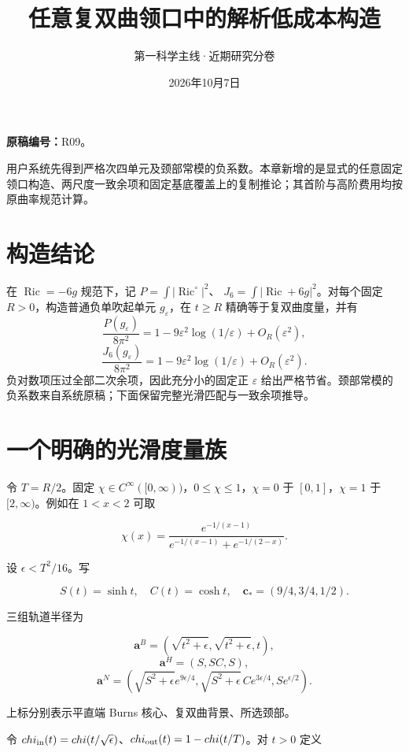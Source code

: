 \documentclass[UTF8,11pt,fontset=none]{ctexart}
\title{任意复双曲领口中的解析低成本构造}
\author{第一科学主线·近期研究分卷}
\date{2026年10月7日}
\begin{document}
\maketitle
\noindent\textbf{原稿编号：}R09。

用户系统先得到严格次四单元及颈部常模的负系数。本章新增的是显式的任意固定领口构造、两尺度一致余项和固定基底覆盖上的复制推论；其首阶与高阶费用均按原曲率规范计算。\cite{R09,System,CellSource}

\section{构造结论}\label{ch9:ux6784ux9020ux7ed3ux8bba}

在 \(\operatorname{Ric}=-6g\) 规范下，记 \(P=\int|\operatorname{Ric}^{\circ}|^2\)、 \(J_6=\int|\operatorname{Ric}+6g|^2\)。对每个固定 \(R>0\)，构造普通负单吹起单元 \(g_\varepsilon\)，在 \(t\ge R\) 精确等于复双曲度量，并有 \[
\frac{P(g_\varepsilon)}{8\pi^2}
=1-9\varepsilon^2\log(1/\varepsilon)+O_R(\varepsilon^2),
\] \[
\frac{J_6(g_\varepsilon)}{8\pi^2}
=1-9\varepsilon^2\log(1/\varepsilon)+O_R(\varepsilon^2).
\tag{9.1}\label{eq:r9:1}
\] 负对数项压过全部二次余项，因此充分小的固定正 \(\varepsilon\) 给出严格节省。颈部常模的负系数来自系统原稿；下面保留完整光滑匹配与一致余项推导。

\section{一个明确的光滑度量族}\label{ch9:ux4e00ux4e2aux660eux786eux7684ux5149ux6ed1ux5ea6ux91cfux65cf}

令 \(T=R/2\)。固定 \(\chi\in C^\infty([0,\infty))\)，\(0\le\chi\le1\)，\(\chi=0\) 于 \([0,1]\)，\(\chi=1\) 于 \([2,\infty)\)。例如在 \(1<x<2\) 可取

\[
\chi(x)=\frac{e^{-1/(x-1)}}{e^{-1/(x-1)}+e^{-1/(2-x)}}.
\]

设 \(\epsilon<T^2/16\)。写

\[
S(t)=\sinh t,\quad C(t)=\cosh t,\quad
\mathbf c_*=(9/4,3/4,1/2).
\]

三组轨道半径为

\[
\mathbf a^B=(\sqrt{t^2+\epsilon},\sqrt{t^2+\epsilon},t),
\] \[
\mathbf a^H=(S,SC,S),
\] \[
\mathbf a^N=
\left(\sqrt{S^2+\epsilon}e^{9\epsilon/4},
\sqrt{S^2+\epsilon}\,C e^{3\epsilon/4},
S e^{\epsilon/2}\right).
\]

上标分别表示平直端 Burns 核心、复双曲背景、所选颈部。

令 \(\chi_{\rm in}(t)=\chi(t/\sqrt\epsilon)\)、\(\chi_{\rm out}(t)=1-\chi(t/T)\)。对 \(t>0\) 定义
\end{document}
